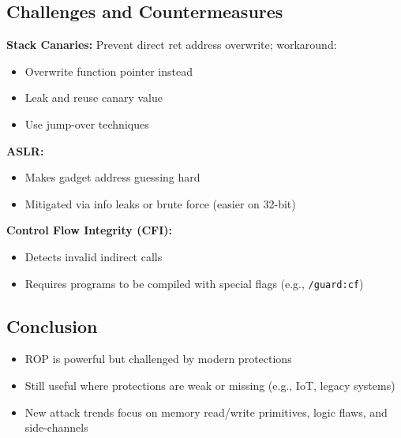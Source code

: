 \subsection{Challenges and Countermeasures}
{
\textbf{Stack Canaries:} Prevent direct ret address overwrite; workaround:
\begin{itemize}[noitemsep]
  \item Overwrite function pointer instead
  \item Leak and reuse canary value
  \item Use jump-over techniques
\end{itemize}

\textbf{ASLR:}
\begin{itemize}[noitemsep]
  \item Makes gadget address guessing hard
  \item Mitigated via info leaks or brute force (easier on 32-bit)
\end{itemize}

\textbf{Control Flow Integrity (CFI):}
\begin{itemize}[noitemsep]
  \item Detects invalid indirect calls
  \item Requires programs to be compiled with special flags (e.g., \texttt{/guard:cf})
\end{itemize}
}

\subsection{Conclusion}
{
\begin{itemize}[noitemsep]
  \item ROP is powerful but challenged by modern protections
  \item Still useful where protections are weak or missing (e.g., IoT, legacy systems)
  \item New attack trends focus on memory read/write primitives, logic flaws, and side-channels
\end{itemize}
}


